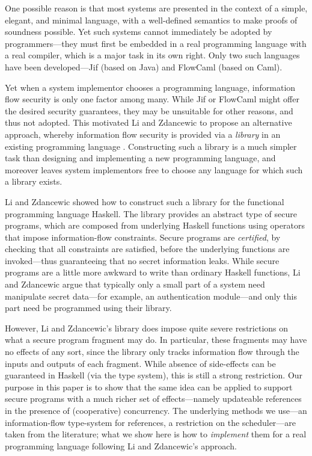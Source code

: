 \documentclass[times, 10pt,twocolumn]{article}
\begin{document}
One possible reason is that most systems are presented in the context
of a simple, elegant, and minimal language, with a well-defined
semantics to make proofs of soundness possible. Yet such systems
cannot immediately be adopted by programmers---they must first be
embedded in a real programming language with a real compiler, which is
a major task in its own right. Only two such languages have been
developed---Jif \cite{Myers:POPL99,jif} (based on Java) and FlowCaml
\cite{Pottier:Simonet:POPL02,simonet03flow} (based on Caml).

Yet when a system implementor chooses a programming language,
information flow security is only one factor among many. While Jif or
FlowCaml might offer the desired security guarantees, they may be
unsuitable for other reasons, and thus not adopted. This motivated Li
and Zdancewic to propose an alternative approach, whereby information
flow security is provided via a {\em library} in an existing
programming language \cite{LiZdancewic:CSFW06}. Constructing such a library
is a much simpler task than designing and implementing a new
programming language, and moreover leaves system implementors free to
choose any language for which such a library exists.

Li and Zdancewic showed how to construct such a library for the
functional programming language Haskell. The library provides an
abstract type of secure programs, which are composed from underlying
Haskell functions using operators that impose information-flow
constraints. Secure programs are {\em certified}, by checking that all
constraints are satisfied, before the underlying functions are
invoked---thus guaranteeing that no secret information leaks. While
secure programs are a little more awkward to write than ordinary
Haskell functions, Li and Zdancewic argue that typically only a small
part of a system need manipulate secret data---for example, an
authentication module---and only this part need be programmed using
their library.

However, Li and Zdancewic's library does impose quite severe
restrictions on what a secure program fragment may do. In particular,
these fragments may have no effects of any sort, since the library
only tracks information flow through the inputs and outputs of each
fragment. While absence of side-effects can be guaranteed in Haskell
(via the type system), this is still a strong restriction. Our purpose
in this paper is to show that the same idea can be applied to support
secure programs with a much richer set of effects---namely updateable
references in the presence of (cooperative) concurrency. The
underlying methods we use---an information-flow type-system for
references, a restriction on the scheduler---are taken from the
literature; what we show here is how to {\em implement} them for a
real programming language following Li and Zdancewic's approach.
\end{document}
